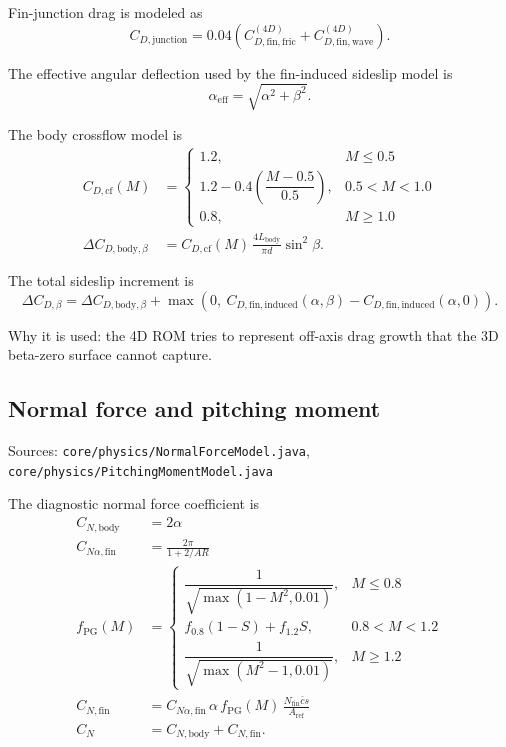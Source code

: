 \documentclass[11pt]{article}
\begin{document}
Fin-junction drag is modeled as
\begin{equation*}
C_{D,\mathrm{junction}} = 0.04\left(C_{D,\mathrm{fin,fric}}^{(4D)} + C_{D,\mathrm{fin,wave}}^{(4D)}\right).
\end{equation*}

The effective angular deflection used by the fin-induced sideslip model is
\begin{equation*}
\alpha_{\mathrm{eff}} = \sqrt{\alpha^2+\beta^2}.
\end{equation*}

The body crossflow model is
\begin{align*}
C_{D,\mathrm{cf}}(M) &=
\begin{cases}
1.2, & M \le 0.5 \\
1.2 - 0.4\left(\dfrac{M-0.5}{0.5}\right), & 0.5 < M < 1.0 \\
0.8, & M \ge 1.0
\end{cases} \\
\Delta C_{D,\mathrm{body},\beta} &= C_{D,\mathrm{cf}}(M)\,\frac{4L_{\mathrm{body}}}{\pi d}\sin^2\beta.
\end{align*}

The total sideslip increment is
\begin{equation*}
\Delta C_{D,\beta} = \Delta C_{D,\mathrm{body},\beta}
+ \max\!\left(0,\ C_{D,\mathrm{fin,induced}}(\alpha,\beta) - C_{D,\mathrm{fin,induced}}(\alpha,0)\right).
\end{equation*}

Why it is used: the 4D ROM tries to represent off-axis drag growth that the 3D beta-zero surface cannot capture.

\subsection{Normal force and pitching moment}
Sources: \texttt{core/physics/NormalForceModel.java}, \texttt{core/physics/PitchingMomentModel.java}

The diagnostic normal force coefficient is
\begin{align*}
C_{N,\mathrm{body}} &= 2\alpha \\
C_{N\alpha,\mathrm{fin}} &= \frac{2\pi}{1+2/AR} \\
f_{\mathrm{PG}}(M) &=
\begin{cases}
\dfrac{1}{\sqrt{\max(1-M^2,0.01)}}, & M \le 0.8 \\
f_{0.8}(1-S) + f_{1.2}S, & 0.8 < M < 1.2 \\
\dfrac{1}{\sqrt{\max(M^2-1,0.01)}}, & M \ge 1.2
\end{cases} \\
C_{N,\mathrm{fin}} &= C_{N\alpha,\mathrm{fin}}\,\alpha\,f_{\mathrm{PG}}(M)\,\frac{N_{\mathrm{fin}}\bar c s}{A_{\mathrm{ref}}} \\
C_N &= C_{N,\mathrm{body}} + C_{N,\mathrm{fin}}.
\end{align*}
\end{document}
